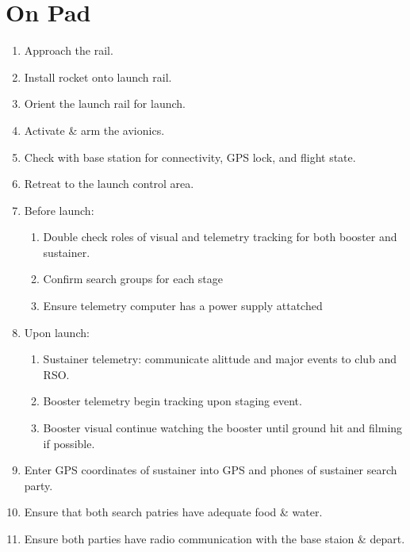 \documentclass[12pt]{article}
\begin{document}
\section{On Pad}
\begin{addmargin}[3em]{3em}
	\begin{enumerate}[label=\thesection.\arabic*\quad$\square$]
		\item Approach the rail.
		\item Install rocket onto launch rail.
		\item Orient the launch rail for launch.
		\item Activate \& arm the avionics.
		\item Check with base station for connectivity, GPS lock, and flight state.
		\item Retreat to the launch control area.
		\item Before launch:
		\begin{enumerate} [label=\thesection.\arabic{enumi}.\arabic*\quad$\square$]
			\item Double check roles of visual and telemetry tracking for both booster and sustainer.
			\item Confirm search groups for each stage
			\item Ensure telemetry computer has a power supply attatched
		\end{enumerate}
		\item Upon launch:
		\begin{enumerate} [label=\thesection.\arabic{enumi}.\arabic*\quad$\square$]
			\item Sustainer telemetry: communicate alittude and major events to club and RSO.
			\item Booster telemetry begin tracking upon staging event.
			\item Booster visual continue watching the booster until ground hit and filming if possible.
		\end{enumerate}
		\item Enter GPS coordinates of sustainer into GPS and phones of sustainer search party.
		\item Ensure that both search patries have adequate food \& water.
		\item Ensure both parties have radio communication with the base staion \& depart. 
	\end{enumerate}
\end{addmargin}
\end{document}
